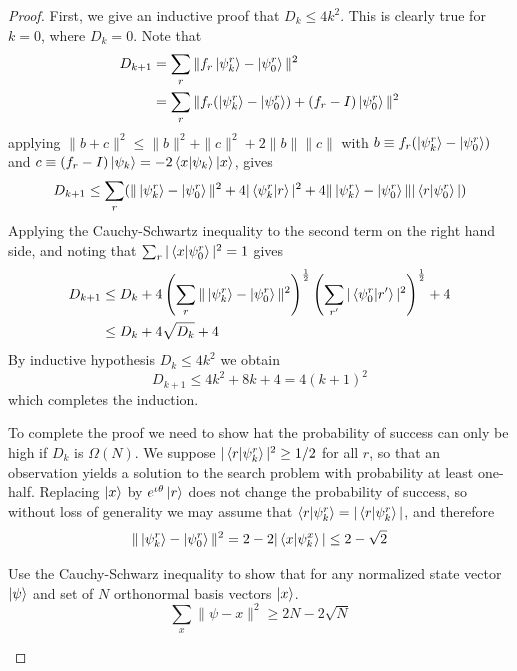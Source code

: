 \begin{proof}
    First, we give an inductive proof that $D_k\leq 4k^2$. This is clearly true for $k=0$, where $D_k=0$. Note that
    \begin{align*}
        D_{k+1}&=\sum_r \|f_r\ket{\psi_k^r} - \ket{\psi_0^r}\|^2\\
        &=\sum_r \|f_r(\ket{\psi_k^r} - \ket{\psi_0^r}) + (f_r -I)\ket{\psi_0^r}\|^2
    \end{align*}
    applying $\|b+c\|^2 \leq \|b\|^2 + \|c\|^2 + 2 \|b\|\|c\|$ with $b\equiv f_r (\ket{\psi_k^r}-\ket{\psi_0^r})$ and $c\equiv (f_r-I)\ket{\psi_k}=-2\braket{x|\psi_k}\ket{x}$, gives
    \[
    D_{k+1} \leq \sum_r (\|\ket{\psi_k^r} - \ket{\psi_0^r}\|^2 + 4|\braket{\psi_k^r|r}|^2 + 4\|\ket{\psi_k^r}-\ket{\psi_0^r}\||\braket{r|\psi_0^r}|)
    \]
    Applying the Cauchy-Schwartz inequality to the second term on the right hand side, and noting that $\sum_r|\braket{x|\psi_0^r}|^2=1$ gives
    \begin{align*}
        D_{k+1} &\leq D_k + 4 \left(\sum_r \|\ket{\psi_k^r} - \ket{\psi_0^r}\|^2\right)^{\frac{1}{2}} \left(\sum_{r'} |\braket{\psi_0^r|r'}|^2\right)^{\frac{1}{2}} + 4\\
        &\leq D_k + 4 \sqrt{D_k} + 4
    \end{align*}
    By inductive hypothesis $D_k \leq 4k^2$ we obtain
    \[
    D_{k+1} \leq 4k^2 + 8k + 4 = 4(k+1)^2
    \]
    which completes the induction.

    To complete the proof we need to show hat the probability of success can only be high if $D_k$ is $\Omega(N)$. We suppose $|\braket{r|\psi_k^r}|^2 \geq 1/2$ for all $r$, so that an observation yields a solution to the search problem with probability at least one-half. Replacing $\ket{x}$ by $e^{\iota \theta}\ket{r}$ does not change the probability of success, so without loss of generality we may assume that $\braket{r|\psi_k^r}=|\braket{r|\psi_k^r}|$, and therefore
    \[
    \|\ket{\psi_k^r}-\ket{\psi_0^r}\|^2 =2-2|\braket{x|\psi_k^x}|\leq 2-\sqrt{2}
    \]
\begin{example}
    Use the Cauchy-Schwarz inequality to show that for any normalized state vector $\ket{\psi}$ and set of $N$ orthonormal basis vectors $\ket{x}$.
    \[
    \sum_x \|\psi-x\|^2 \geq 2N-2\sqrt{N}
    \]
    

\end{example}
\end{proof}
